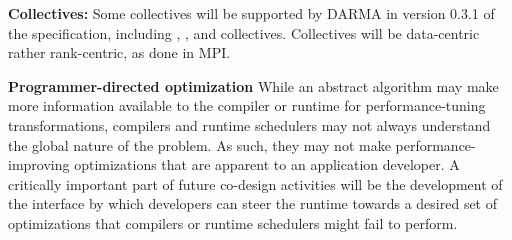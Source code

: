 \begin{compactdesc}
\item {\bf Collectives:}
  Some collectives will be supported by \gls{DARMA} in version 0.3.1 of
  the specification, including ,
  , and  collectives.
Collectives will be data-centric rather rank-centric, as done in MPI.
\item{\bf Programmer-directed optimization}
While an abstract algorithm may make more information available to the compiler or runtime for performance-tuning transformations,
compilers and runtime schedulers may not always understand the global nature of the problem.
As such, they may not make performance-improving optimizations that are apparent to an application developer.
A critically important part of future co-design activities will be the
development of the interface by which developers can steer the runtime towards
a desired set of optimizations that compilers or runtime schedulers might fail
to perform.
\end{compactdesc}






 

